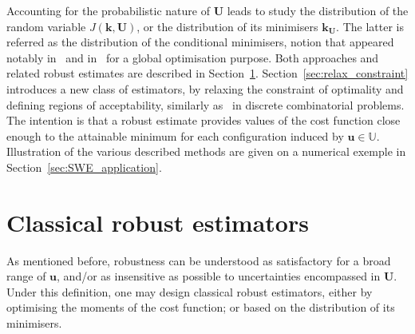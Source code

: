 \documentclass[preprint, 1p]{elsarticle}
\newcommand{\kest}{\hat{\mathbf{k}}}
\newcommand{\Uspace}{\mathbb{U}}
\begin{document}
Accounting for the probabilistic nature of  $\mathbf{U}$ leads to study the distribution of the random variable $J(\mathbf{k},\mathbf{U})$, or the distribution of its minimisers ${\mathbf{k}}_{\mathbf{U}}$. The latter is referred as 
the distribution of the conditional minimisers, notion that appeared notably in~\cite{villemonteix_informational_2006} and in~\cite{hennig_entropy_2011} for a global optimisation purpose. Both approaches and related robust estimates are described in Section~\ref{robust formulations}. Section~\ref{sec:relax_constraint} introduces a new class of estimators, by relaxing the constraint of optimality and defining regions of acceptability, similarly as~\cite{buhmann_robust_2013} in discrete combinatorial problems.  The intention is that a robust estimate provides values of the cost function close enough to the attainable minimum for each configuration induced by $\mathbf{u}\in\Uspace$. Illustration of the various described methods are given on a numerical exemple in Section~\ref{sec:SWE_application}.



\section{Classical robust estimators}
\label{robust formulations}

As mentioned before, robustness can be understood as satisfactory for a broad range of $\mathbf{u}$, and/or as insensitive as possible to uncertainties encompassed in $\mathbf{U}$. Under this definition, one may design classical robust estimators, either by optimising the moments of the cost function; or based on the distribution of its minimisers.


%
\end{document}
